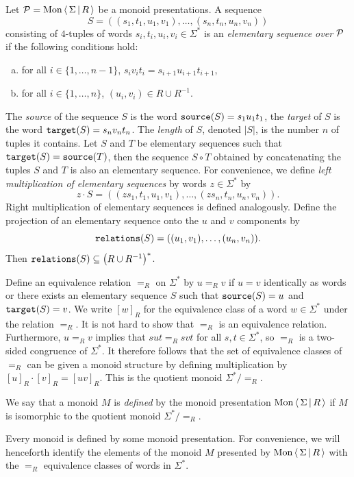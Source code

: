 \begin{definition}%
\label{def:elementary_sequence}
\rocqok{}
Let $\mathcal{P} = \textrm{Mon}\left\langle\, \Sigma \,\middle|\, R \,\right\rangle$ be a monoid presentations.
A sequence
\[
  S = ((s_1, t_1, u_1, v_1), \ldots, (s_n, t_n, u_n, v_n))
\]
consisting of $4$-tuples
of words $s_i, t_i, u_i, v_i \in \Sigma^\ast$ is an
\emph{elementary sequence over $\mathcal{P}$} if the following conditions hold:
\begin{enumerate}[(a)]
  \item for all $i \in \{1, \ldots, n-1\}$, $s_i v_i t_i = s_{i+1} u_{i+1} t_{i+1}$,
  \item for all $i \in \{1, \ldots, n\}$,
    $(u_i, v_i)\in R \cup R^{-1}$.
\end{enumerate}
\end{definition}
The \emph{source} of the sequence $S$ is the word $\texttt{source}(S) = s_1u_1t_1$, the \emph{target} of $S$ is the word
$\texttt{target}(S)=s_n v_n t_n$.
The \emph{length} of $S$, denoted $|S|$, is the number $n$ of tuples it contains. Let $S$ and $T$ be elementary
sequences such that $\texttt{target}(S) = \texttt{source}(T)$, then the sequence $S \circ T$ obtained by concatenating the tuples $S$
and $T$ is also an elementary sequence.
For convenience, we define \emph{left multiplication of elementary sequences} by words $z\in\Sigma^\ast$ by
\[
  z\cdot S = \left((zs_1, t_1, u_1, v_1), \ldots, (zs_n, t_n,  u_n,v_n)\right).
\]
Right multiplication of elementary sequences is defined analogously.
Define the projection of an elementary sequence onto the $u$ and $v$ components by
\[
  \texttt{relations}(S) = ((u_1, v_1), \ldots, (u_n, v_n)).
\]
Then $\texttt{relations}(S)\subseteq {\left(R\cup R^{-1}\right)}^\ast$.

Define an equivalence relation $=_R$ on $\Sigma^\ast$ by $u =_R v$ if $u = v$ identically as words or there exists an
elementary sequence $S$ such that $\texttt{source}(S) = u$ and $\texttt{target}(S) = v$.
We write ${[w]}_R$ for the equivalence class of
a word $w\in \Sigma^\ast$ under the relation $=_R$. It is not hard to show that $=_R$ is an equivalence
relation. Furthermore, $u =_R v$ implies that $sut =_R svt$ for all $s, t\in \Sigma^\ast$, so $=_R$ is a two-sided
congruence of $\Sigma^\ast$. It therefore follows that the set of equivalence classes of $=_R$ can be given a monoid
structure by defining multiplication by ${[u]}_R \cdot {[v]}_R = {[uv]}_R$. This is the quotient monoid
$\Sigma^\ast / {=_R}$.
\begin{definition}%
  \label{def:presented_monoid}
  \rocqok{}
We say that a monoid $M$ is \emph{defined} by the monoid presentation $\textrm{Mon}\left\langle\, \Sigma \,\middle|\, R \,\right\rangle$ if $M$ is isomorphic to
the quotient monoid $\Sigma^\ast / {=_R}$.
\end{definition}
Every monoid is defined by some monoid presentation. For convenience, we will
henceforth identify the elements of the monoid $M$ presented by $\textrm{Mon}\left\langle\, \Sigma \,\middle|\, R \,\right\rangle$ with the $=_R$ equivalence
classes of words in $\Sigma^\ast$.

